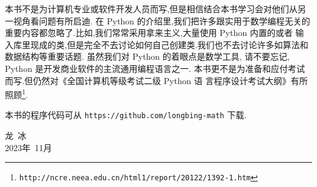 本书不是为计算机专业或软件开发人员而写,但是相信结合本书学习会对他们从另一视角看问题有所启迪.
在 Python 的介绍里,我们把许多跟实用于数学编程无关的重要内容都忽略了.比如,我们常常采用拿来主义,大量使用 Python 内置的或者
输入库里现成的类,但是完全不去讨论如何自己创建类.我们也不去讨论许多如算法和数据结构等重要话题. 虽然我们对 Python 的着眼点是数学工具,
请不要忘记, Python 是开发商业软件的主流通用编程语言之一.
本书更不是为准备和应付考试而写.但仍然对《全国计算机等级考试二级 Python 语 言程序设计考试大纲》有所照顾\footnote{\texttt{http://ncre.neea.edu.cn/html1/report/20122/1392-1.htm}}.

本书的程序代码可从 \verb|https://github.com/longbing-math| 下载.



{\kaishu
	\begin{center}
		\hspace*{88mm}龙\,   冰\\
		\hspace*{88mm}2023年~11月
	\end{center}
}


